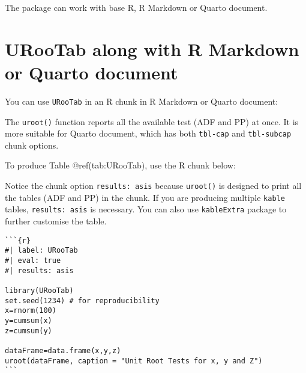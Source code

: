 \documentclass[
  letterpaper,
  DIV=11,
  numbers=noendperiod]{scrartcl}
\begin{document}
The package can work with base R, R Markdown or Quarto document.

\hypertarget{urootab-along-with-r-markdown-or-quarto-document}{%
\section{URooTab along with R Markdown or Quarto
document}\label{urootab-along-with-r-markdown-or-quarto-document}}

You can use \texttt{URooTab} in an R chunk in R Markdown or Quarto
document:

The \texttt{uroot()} function reports all the available test (ADF and
PP) at once. It is more suitable for Quarto document, which has both
\texttt{tbl-cap} and \texttt{tbl-subcap} chunk options.

To produce Table @ref(tab:URooTab), use the R chunk below:

Notice the chunk option \texttt{results:\ asis} because \texttt{uroot()}
is designed to print all the tables (ADF and PP) in the chunk. If you
are producing multiple \texttt{kable} tables, \texttt{results:\ asis} is
necessary. You can also use \texttt{kableExtra} package to further
customise the table.

\begin{verbatim}
```{r}
#| label: URooTab
#| eval: true
#| results: asis
    
library(URooTab)
set.seed(1234) # for reproducibility
x=rnorm(100)
y=cumsum(x)
z=cumsum(y)

dataFrame=data.frame(x,y,z)
uroot(dataFrame, caption = "Unit Root Tests for x, y and Z")
```
\end{verbatim}
\end{document}
